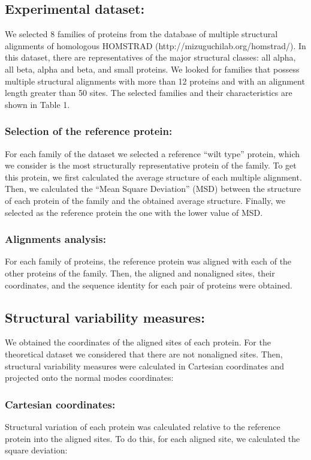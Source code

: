 \documentclass{article}
\begin{document}
\begin{multicols}{2}
{\subsection*{Experimental dataset:}
We selected 8 families of proteins from the database of multiple structural alignments of homologous HOMSTRAD (http://mizuguchilab.org/homstrad/). In this dataset, there are representatives of the major structural classes: all alpha, all beta, alpha and beta, and small proteins. We looked for families that possess multiple structural alignments with more than 12 proteins and with an alignment length greater than 50 sites. The selected families and their characteristics are shown in Table 1.

\subsubsection*{Selection of the reference protein:}
For each family of the dataset we selected a reference ``wilt type'' protein, which we consider is the most structurally representative protein of the family. To get this protein, we first calculated the average structure of each multiple alignment. Then, we calculated the ``Mean Square Deviation'' (MSD) between the structure of each protein of the family and the obtained average structure. Finally, we selected as the reference protein the one with the lower value of MSD.

\subsubsection*{Alignments analysis:}
For each family of proteins, the reference protein was aligned with each of the other proteins of the family. Then, the aligned and nonaligned sites, their coordinates, and the sequence identity for each pair of proteins were obtained. 

\subsection*{ Structural variability measures:}
We obtained the coordinates of the aligned sites of each protein. For the theoretical dataset we considered that there are not nonaligned sites. Then, structural variability measures were calculated in Cartesian coordinates and projected onto the normal modes coordinates:

\subsubsection*{ Cartesian coordinates:}
Structural variation of each protein was calculated relative to the reference protein into the aligned sites. To do this, for each aligned site, we calculated the square deviation:
 
}
\end{multicols}
\end{document}
